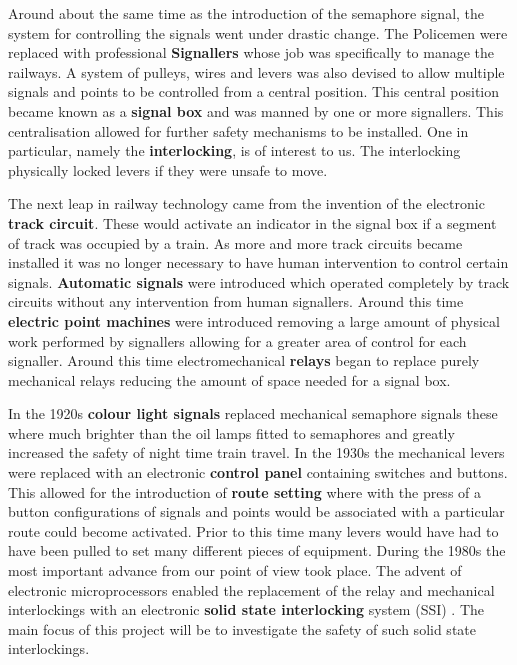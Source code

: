 Around about the same time as the introduction of the semaphore signal, the system
for controlling the signals went under drastic change. The Policemen were
replaced with professional \textbf{Signallers} whose job was specifically to
manage the railways. A system of pulleys, wires and levers was also devised
to allow multiple signals and points to be controlled from a central
position. This central position became known as a \textbf{signal box} and was
manned by one or more signallers. This centralisation allowed for further
safety mechanisms to be installed. One in particular, namely the \textbf{interlocking},
is of interest to us. The interlocking physically locked levers if they were
unsafe to move.

The next leap in railway technology came from the invention of the electronic
\textbf{track circuit}. These would activate an indicator in the signal box if a
segment of track was occupied by a train. As more and more track circuits
became installed it was no longer necessary to have human intervention to
control certain signals. \textbf{Automatic signals} were introduced which
operated completely by track circuits without any intervention from human
signallers. Around this time \textbf{electric point machines} were introduced
removing a large amount of physical work performed by signallers allowing for
a greater area of control for each signaller.  Around this time
electromechanical \textbf{relays} began to replace purely mechanical relays
reducing the amount of space needed for a signal box.

In the 1920s \textbf{colour light signals} replaced mechanical semaphore signals these where much brighter than the oil
lamps fitted to semaphores and greatly increased the safety of night time
train travel. In the 1930s the mechanical levers were replaced with an electronic \textbf{control panel}
containing switches and buttons. This allowed for the introduction of
\textbf{route setting} where with the press of a button configurations of signals and points would be
associated with a particular route could become activated. Prior to this time
many levers would have had to have been pulled to set many different pieces of equipment.
During the 1980s the most important advance from our point of view took
place. The advent of electronic microprocessors enabled the replacement of the
relay and mechanical interlockings with an electronic \textbf{solid state interlocking}
system (SSI) \cite{AC08}. The main focus of this project will be to investigate the safety
of such solid state interlockings.


